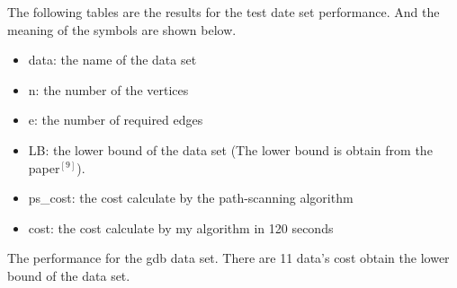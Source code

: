 \documentclass[conference,compsoc]{IEEEtran}
\begin{document}
\begin{appendix}
The following tables are the results for the test date set performance. And the meaning of the symbols are shown below.
\begin{itemize}
\item data: the name of the data set
\item n: the number of the vertices
\item e: the number of required edges
\item LB: the lower bound of the data set (The lower bound is obtain from the paper$^{[9]}$).
\item ps\_cost: the cost calculate by the path-scanning algorithm
\item cost: the cost calculate by my algorithm in 120 seconds
\end{itemize}

The performance for the gdb data set. There are 11 data's cost obtain the lower bound of the data set.


\end{appendix}
\end{document}
